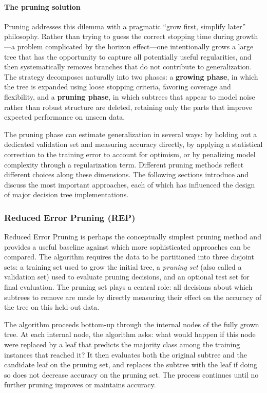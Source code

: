 \paragraph{The pruning solution}

Pruning addresses this dilemma with a pragmatic ``grow first, simplify later'' philosophy.
Rather than trying to guess the correct stopping time during growth---a problem complicated
by the horizon effect---one intentionally grows a large tree that has the opportunity to
capture all potentially useful regularities, and then systematically removes branches that
do not contribute to generalization. The strategy decomposes naturally into two phases: a
\textbf{growing phase}, in which the tree is expanded using loose stopping criteria,
favoring coverage and flexibility, and a \textbf{pruning phase}, in which subtrees that
appear to model noise rather than robust structure are deleted, retaining only the parts that
improve expected performance on unseen data.

The pruning phase can estimate generalization in several ways: by holding out a dedicated
validation set and measuring accuracy directly, by applying a statistical correction to the
training error to account for optimism, or by penalizing model complexity through a
regularization term. Different pruning methods reflect different choices along these
dimensions. The following sections introduce and discuss the most important approaches, each
of which has influenced the design of major decision tree implementations.

\subsubsection*{Reduced Error Pruning (REP)}

Reduced Error Pruning is perhaps the conceptually simplest pruning
method and provides a useful baseline against which more sophisticated approaches can be
compared. The algorithm requires the data to be partitioned into three disjoint sets: a
training set used to grow the initial tree, a \emph{pruning set} (also called a validation
set) used to evaluate pruning decisions, and an optional test set for final evaluation. The
pruning set plays a central role: all decisions about which subtrees to remove are made by
directly measuring their effect on the accuracy of the tree on this held-out data.

The algorithm proceeds bottom-up through the internal nodes of the fully grown tree. At each
internal node, the algorithm asks: what would happen if this node were replaced by a leaf
that predicts the majority class among the training instances that reached it? It then
evaluates both the original subtree and the candidate leaf on the pruning set, and replaces
the subtree with the leaf if doing so does not decrease accuracy on the pruning set. The
process continues until no further pruning improves or maintains accuracy.

